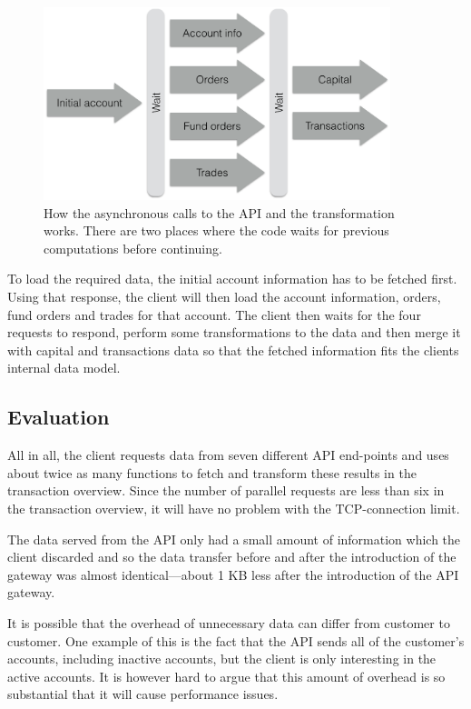 \documentclass{cslthse-msc}
\begin{document}
\begin{figure}[H]
  \centering
    \begin{center}
      \includegraphics[width=0.9\textwidth]{images/bank_overview.png}
    \end{center}
  \caption{How the asynchronous calls to the API and the transformation works. There are two places where the code waits for previous computations before continuing.}
\end{figure}

To load the required data, the initial account information has to be fetched first. Using that response, the client will then load the account information, orders, fund orders and trades for that account. The client then waits for the four requests to respond, perform some transformations to the data and then merge it with capital and transactions data so that the fetched information fits the clients internal data model.

\subsection{Evaluation}
All in all, the client requests data from seven different API end-points and uses about twice as many functions to fetch and transform these results in the transaction overview. Since the number of parallel requests are less than six in the transaction overview, it will have no problem with the TCP-connection limit.

The data served from the API only had a small amount of information which the client discarded and so the data transfer before and after the introduction of the gateway was almost identical---about 1 KB less after the introduction of the API gateway.

It is possible that the overhead of unnecessary data can differ from customer to customer. One example of this is the fact that the API sends all of the customer's accounts, including inactive accounts, but the client is only interesting in the active accounts. It is however hard to argue that this amount of overhead is so substantial that it will cause performance issues.
\end{document}
